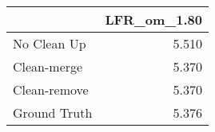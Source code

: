 \begin{tabular}{lr}
\toprule
{} & LFR_om_1.80 \\
\midrule
No Clean Up  &       5.510 \\
Clean-merge  &       5.370 \\
Clean-remove &       5.370 \\
Ground Truth &       5.376 \\
\bottomrule
\end{tabular}

